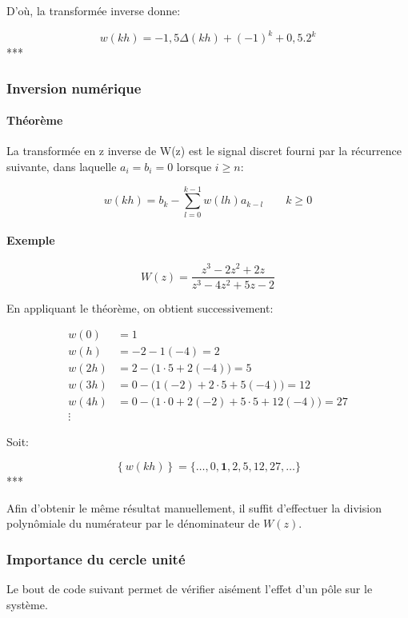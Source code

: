 \documentclass[11pt]{article}
\begin{document}
D'où, la transformée inverse donne:

\[ w(kh) = -1,5\Delta(kh)+(-1)^k+0,5.2^k \] ***

    \subsubsection{Inversion numérique}\label{inversion-numuxe9rique}

    \paragraph{Théorème}\label{thuxe9oruxe8me}

La transformée en z inverse de W(z) est le signal discret fourni par la
récurrence suivante, dans laquelle \(a_i = b_i = 0\) lorsque
\(i \ge n\):

\[ w(kh) = b_k-\sum_{l=0}^{k-1}w(lh)a_{k-l} \qquad k \geq 0 \]

    \paragraph{Exemple}\label{exemple}

\[ W(z) = \frac{z^3-2z^2+2z}{z^3-4z^2+5z-2} \]

En appliquant le théorème, on obtient successivement:

\begin{align}
w(0) &= 1 \\
w(h) &= -2-1(-4) = 2 \\
w(2h) &= 2-\big(1 \cdot 5 + 2(-4)\big) = 5 \\
w(3h) &= 0-\big(1(-2) + 2 \cdot 5 + 5(-4)\big) = 12 \\
w(4h) &= 0-\big(1 \cdot 0 + 2(-2) + 5 \cdot 5 + 12(-4)\big) = 27 \\
\vdots
\end{align}

Soit:

\[ \left\{ w(kh) \right\} = \{ \dots, 0, \mathbf{1}, 2, 5, 12, 27, \dots \} \]
***

    Afin d'obtenir le même résultat manuellement, il suffit d'effectuer la
division polynômiale du numérateur par le dénominateur de \(W(z)\).

    \subsubsection{Importance du cercle
unité}\label{importance-du-cercle-unituxe9}

    Le bout de code suivant permet de vérifier aisément l'effet d'un pôle
sur le système.
\end{document}
